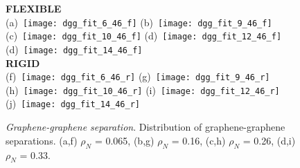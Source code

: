 \documentclass[12pt]{article}
\begin{document}
\begin{figure}[h!]
	\centering
	\textbf{FLEXIBLE} \\
	(a)~\texttt{[image: dgg\_fit\_6\_46\_f]} 
	(b)~\texttt{[image: dgg\_fit\_9\_46\_f]}
	(c)~\texttt{[image: dgg\_fit\_10\_46\_f]}
	(d)~\texttt{[image: dgg\_fit\_12\_46\_f]}
	(d)~\texttt{[image: dgg\_fit\_14\_46\_f]} \\  \vspace{-5pt} 
	\textbf{RIGID} \\
	(f)~\texttt{[image: dgg\_fit\_6\_46\_r]} 
	(g)~\texttt{[image: dgg\_fit\_9\_46\_r]}
	(h)~\texttt{[image: dgg\_fit\_10\_46\_r]}
	(i)~\texttt{[image: dgg\_fit\_12\_46\_r]}
	(j)~\texttt{[image: dgg\_fit\_14\_46\_r]}
	\caption{\textit{Graphene-graphene separation}. Distribution of graphene-graphene separations. (a,f) \(\rho_N\) = 0.065, (b,g) \(\rho_N\) = 0.16, (c,h) \(\rho_N\) = 0.26, (d,i) \(\rho_N\) = 0.33.}
	\label{fig:dgg_distribution}
\end{figure}
\end{document}
